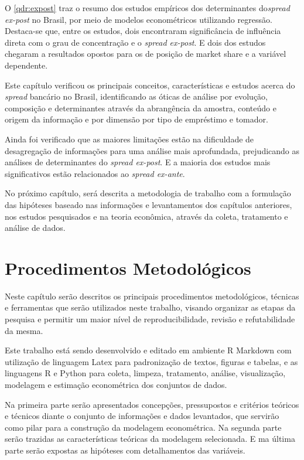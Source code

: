 \documentclass[
  12pt,
  12pt,
  openright,
  oneside,
  a4paper,
  chapter=TITLE,
  section=TITLE,
  subsection=TITLE,
  subsubsection=TITLE,
  english,
  portugues,
  sumario=tradicional]{abntex2}
\begin{document}
O \autoref{qdr:expost} traz o resumo dos estudos empíricos dos determinantes do\emph{spread ex-post} no Brasil, por meio de modelos econométricos utilizando regressão. Destaca-se que, entre os estudos, dois encontraram significância de influência direta com o grau de concentração e o \emph{spread ex-post}. E dois dos estudos chegaram a resultados opostos para os de posição de market share e a variável dependente.

Este capítulo verificou os principais conceitos, características e estudos acerca do \emph{spread} bancário no Brasil, identificando as óticas de análise por evolução, composição e determinantes através da abrangência da amostra, conteúdo e origem da informação e por dimensão por tipo de empréstimo e tomador.

Ainda foi verificado que as maiores limitações estão na dificuldade de desagregação de informações para uma análise mais aprofundada, prejudicando as análises de determinantes do \emph{spread ex-post}. E a maioria dos estudos mais significativos estão relacionados ao \emph{spread ex-ante}.

No próximo capítulo, será descrita a metodologia de trabalho com a formulação das hipóteses baseado nas informações e levantamentos dos capítulos anteriores, nos estudos pesquisados e na teoria econômica, através da coleta, tratamento e análise de dados.

\textual
\pagestyle{simple}
\parindent 1.50cm

\chapter{Procedimentos Metodológicos}

Neste capítulo serão descritos os principais procedimentos metodológicos, técnicas e ferramentas que serão utilizados neste trabalho, visando organizar as etapas da pesquisa e permitir um maior nível de reproducibilidade, revisão e refutabilidade da mesma.

Este trabalho está sendo desenvolvido e editado em ambiente R Markdown com utilização de linguagem Latex para padronização de textos, figuras e tabelas, e as linguagens R e Python para coleta, limpeza, tratamento, análise, visualização, modelagem e estimação econométrica dos conjuntos de dados.

Na primeira parte serão apresentados concepções, pressupostos e critérios teóricos e técnicos diante o conjunto de informações e dados levantados, que servirão como pilar para a construção da modelagem econométrica. Na segunda parte serão trazidas as características teóricas da modelagem selecionada. E ma última parte serão expostas as hipóteses com detalhamentos das variáveis.
\end{document}
